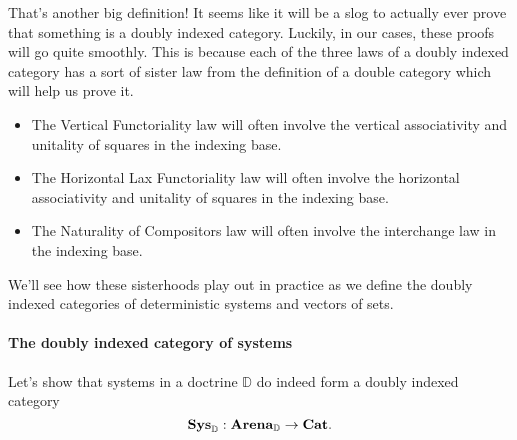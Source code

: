 \documentclass[DynamicalBook]{subfiles}
\begin{document}
That's another big definition! It seems like it will be a slog to actually ever
prove that something is a doubly indexed category. Luckily, in our cases, these
proofs will go quite smoothly. This is because each of the three laws of a
doubly indexed category has a sort of sister law from the definition of a double
category which will help us prove it.

\begin{itemize}
  \item The Vertical Functoriality law will often involve the vertical
    associativity and unitality of squares in the indexing base.
  \item The Horizontal Lax Functoriality law will often involve the horizontal
    associativity and unitality of squares in the indexing base.
  \item The Naturality of Compositors law will often involve the interchange law
    in the indexing base.
\end{itemize}

We'll see how these sisterhoods play out in practice as we define the doubly
indexed categories of deterministic systems and vectors of sets.

\paragraph{The doubly indexed category of systems}

Let's show that systems in a doctrine $\mathbb{D}$ do indeed form a doubly indexed category
$$\textbf{Sys}_{\mathbb{D}} : \textbf{Arena}_{\mathbb{D}} \to \textbf{Cat}.$$
\end{document}
